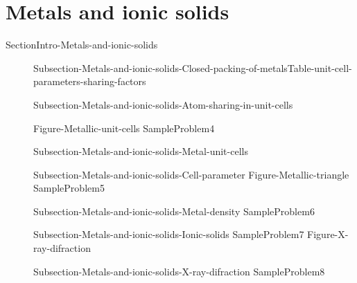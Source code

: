 \documentclass[main.tex]{subfiles}
\newcommand\chapterlabel{Ch-solids}\setcounter{figurenewcounter}{0}\setcounter{tablenewcounter}{0}\setcounter{formulanewcounter}{0}
\begin{document}
\section{Metals and ionic solids}{SectionIntro-Metals-and-ionic-solids}
\sloppy \begin{description}
\item[] {Subsection-Metals-and-ionic-solids-Closed-packing-of-metals}{Table-unit-cell-parameters-sharing-factors}
\item[]  {Subsection-Metals-and-ionic-solids-Atom-sharing-in-unit-cells}

{Figure-Metallic-unit-cells}
{SampleProblem4}
\item[] {Subsection-Metals-and-ionic-solids-Metal-unit-cells}
\item[]  {Subsection-Metals-and-ionic-solids-Cell-parameter}
{Figure-Metallic-triangle}
{SampleProblem5}
\item[]  {Subsection-Metals-and-ionic-solids-Metal-density}
{SampleProblem6}
\item[] {Subsection-Metals-and-ionic-solids-Ionic-solids}
{SampleProblem7}
{Figure-X-ray-difraction}
\item[] {Subsection-Metals-and-ionic-solids-X-ray-difraction}
{SampleProblem8}
\end{description}
\end{document}
